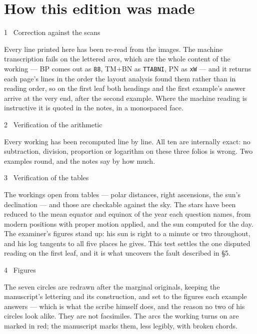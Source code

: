 \documentclass[11pt,twoside,openany]{book}
\begin{document}
\chapter*{How this edition was made}
{\color{msred}\large 1 \textperiodcentered\ Correction against the scans}\par\vspace{4pt}
Every line printed here has been re-read from the images. The machine transcription fails on the lettered arcs, which are the whole content of the working --- BP comes out as \texttt{88}, TM$+$BN as \texttt{TTABNI}, PN as \texttt{xW} --- and it returns each page's lines in the order the layout analysis found them rather than in reading order, so on the first leaf both headings and the first example's answer arrive at the very end, after the second example. Where the machine reading is instructive it is quoted in the notes, in a monospaced face.\par\vspace{10pt}
{\color{msred}\large 2 \textperiodcentered\ Verification of the arithmetic}\par\vspace{4pt}
Every working has been recomputed line by line. All ten are internally exact: no subtraction, division, proportion or logarithm on these three folios is wrong. Two examples round, and the notes say by how much.\par\vspace{10pt}
{\color{msred}\large 3 \textperiodcentered\ Verification of the tables}\par\vspace{4pt}
The workings open from tables --- polar distances, right ascensions, the sun's declination --- and those are checkable against the sky. The stars have been reduced to the mean equator and equinox of the year each question names, from modern positions with proper motion applied, and the sun computed for the day. The examiner's figures stand up: his sun is right to a minute or two throughout, and his log tangents to all five places he gives. This test settles the one disputed reading on the first leaf, and it is what uncovers the fault described in \S5.\par\vspace{10pt}
{\color{msred}\large 4 \textperiodcentered\ Figures}\par\vspace{4pt}
The seven circles are redrawn after the marginal originals, keeping the manuscript's lettering and its construction, and set to the figures each example answers --- which is what the scribe himself does, and the reason no two of his circles look alike. They are not facsimiles. The arcs the working turns on are marked in red; the manuscript marks them, less legibly, with broken chords.\par\vspace{10pt}
\end{document}
